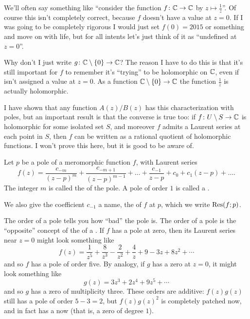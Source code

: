 \begin{abuse}
	We'll often say something like
	``consider the function $f \colon \mathbb C \to \mathbb C$
	by $z \mapsto \frac 1z$''.
	Of course this isn't completely correct,
	because $f$ doesn't have a value at $z=0$.
	If I was going to be completely rigorous
	I would just set $f(0) = 2015$ or something and move on
	with life, but for all intents
	let's just think of it as ``undefined at $z=0$''.

	Why don't I just write $g \colon \mathbb C \setminus \{0\} \to \mathbb C$?
	The reason I have to do this is that it's still important
	for $f$ to remember it's ``trying'' to be holomorphic on $\mathbb C$,
	even if isn't assigned a value at $z=0$.
	As a function $\mathbb C \setminus \{0\} \to \mathbb C$ the function $\frac 1z$ is actually holomorphic.
\end{abuse}

\begin{remark}
	I have shown that any function $A(z)/B(z)$
	has this characterization with poles,
	but an important result is
	that the converse is true too:
	if $f \colon U \setminus S \to \mathbb C$ is holomorphic for some isolated set $S$,
	and moreover $f$ admits a Laurent series at each point in $S$,
	then $f$ can be written as a rational quotient of holomorphic functions.
	I won't prove this here, but it is good to be aware of.
\end{remark}

\begin{definition}
	Let $p$ be a pole of a meromorphic function $f$, with Laurent series
	\[
		f(z) =
		\frac{c_{-m}}{(z-p)^m}
		+ \frac{c_{-m+1}}{(z-p)^{m-1}}
		+ \dots
		+ \frac{c_{-1}}{z-p} + c_0 + c_1 (z-p) + \dots.
	\]
	The integer $m$ is called the  of the pole.
	A pole of order $1$ is called a .

	We also give the coefficient $c_{-1}$ a name, the  of $f$ at $p$,
	which we write $\operatorname{Res}(f;p)$.
\end{definition}

The order of a pole tells you how ``bad'' the pole is.
The order of a pole is the ``opposite'' concept of the  of a .
If $f$ has a pole at zero, then its Laurent series near $z=0$ might look something like
\[ f(z) = \frac{1}{z^5} + \frac{8}{z^3} - \frac{2}{z^2} + \frac{4}{z} + 9 - 3z + 8z^2 + \dotsb \]
and so $f$ has a pole of order five.
By analogy, if $g$ has a zero at $z=0$, it might look something like
\[ g(z) = 3z^3 + 2z^4 + 9z^5 + \dotsb \]
and so $g$ has a zero of multiplicity three.
These orders are additive: $f(z) g(z)$ still has a pole of order $5-3=2$,
but $f(z)g(z)^2$ is completely patched now, and in fact has a  now
(that is, a zero of degree $1$).

